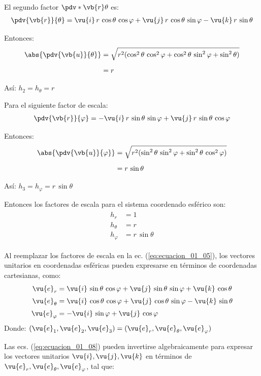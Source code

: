 El segundo factor $\pdv*{\vb{r}}{\theta}$ es:
\begin{align*}
\pdv{\vb{r}}{\theta} = \vu{i} \, r \, \cos \theta \, \cos \varphi + \vu{j} \, r \, \cos \theta \, \sin \varphi - \vu{k} \, r \, \sin \theta
\end{align*}
\par
Entonces:
\begin{align*}
\abs{\pdv{\vb{u}}{\theta}} &= \sqrt{r^{2} (\cos^{2} \theta \, \cos^{2} \varphi + \cos^{2} \theta \, \sin^{2} \varphi + \sin^{2} \theta)} \\[0.5em]
&= r
\end{align*}
\par
Así: $h_{2} = h_{\theta} = r$
\par
Para el siguiente factor de escala:
\begin{align*}
\pdv{\vb{r}}{\varphi} = - \vu{i} \, r \, \sin \theta \, \sin \varphi + \vu{j} \, r \, \sin \theta \, \cos \varphi
\end{align*}
\par
Entonces:
\begin{align*}
\abs{\pdv{\vb{u}}{\varphi}} &= \sqrt{r^{2} (\sin^{2} \theta \, \sin^{2} \varphi + \sin^{2} \theta \, \cos^{2} \varphi)} \\[0.5em]
&= r \, \sin \theta
\end{align*}
\par
Así: $h_{3} = h_{\varphi} = r \, \sin \theta$
\par
Entonces los factores de escala para el sistema coordenado esférico son:
\begin{align}
\begin{aligned}
h_{r} &= 1 \\[0.5em]
h_{\theta} &= r \\[0.5em]
h_{\varphi} &= r \, \sin \theta
\end{aligned}
\label{eq:ecuacion_01_07}
\end{align}
\par
Al reemplazar los factores de escala en la ec. (\ref{eq:ecuacion_01_05}), los vectores unitarios en coordenadas esféricas pueden expresarse en términos de coordenadas cartesianas, como:
\begin{align}
\begin{aligned}
\vu{e}_{r} &= \vu{i} \, \sin \theta \, \cos \varphi + \vu{j} \, \sin \theta \, \sin \varphi + \vu{k} \, \cos \theta \\[0.25em]
\vu{e}_{\theta} &= \vu{i} \, \cos \theta \, \cos \varphi + \vu{j} \, \cos \theta \, \sin \varphi - \vu{k} \, \sin \theta \\[0.25em]
\vu{e}_{\varphi} &= - \vu{i} \, \sin \varphi + \vu{j} \, \cos \varphi
\end{aligned}
\label{eq:ecuacion_01_08}
\end{align}
Donde: $(\vu{e}_{1}, \vu{e}_{2}, \vu{e}_{3}) = (\vu{e}_{r}, \vu{e}_{\theta}, \vu{e}_{\varphi})$
\par
Las ecs. (\ref{eq:ecuacion_01_08}) pueden invertirse algebraicamente para expresar los vectores unitarios $\vu{i}, \vu{j}, \vu{k}$ en términos de $\vu{e}_{r}, \vu{e}_{\theta}, \vu{e}_{\varphi}$, tal que:

